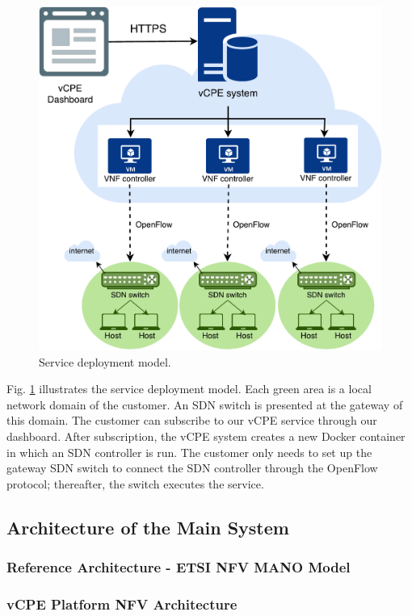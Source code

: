 \begin{figure}[!t]
\centering
\includegraphics[width=\textwidth]{./fig/desc_service_deployment}
\caption{Service deployment model.}
\label{fig:desc_service_deployment}
\end{figure}

Fig. \ref{fig:desc_service_deployment} illustrates the service deployment model. Each green area is a local network domain of the customer. An SDN switch is presented at the gateway of this domain. The customer can subscribe to our vCPE service through our dashboard. After subscription, the vCPE system creates a new Docker container in which an SDN controller is run. The customer only needs to set up the gateway SDN switch to connect the SDN controller through the OpenFlow protocol; thereafter, the switch executes the service.


\subsection{Architecture of the Main System}
\subsubsection{Reference Architecture - ETSI NFV MANO Model}

\subsubsection{vCPE Platform NFV Architecture}


